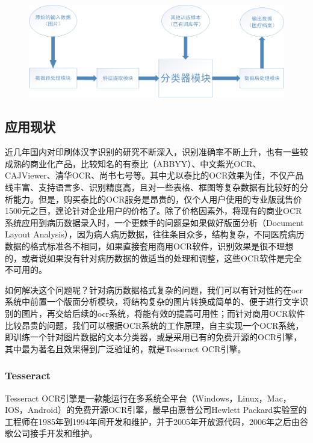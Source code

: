 \begin{figure}
\centering
  \includegraphics[scale=0.3]{figures/ocr-pipeline}
  \label{pic:ocr-pipeline}
\end{figure}

\subsection{应用现状}
近几年国内对印刷体汉字识别的研究不断深入，识别准确率不断上升，也有一些较成熟的商业化产品，比较知名的有泰比（ABBYY）、中文紫光OCR、CAJViewer、清华OCR、尚书七号等。其中尤以泰比的OCR效果为佳，不仅产品线丰富、支持语言多、识别精度高，且对一些表格、框图等复杂数据有比较好的分析能力。但是，购买泰比的OCR服务是昂贵的，仅个人用户使用的专业版就售价1500元之巨，遑论针对企业用户的价格了。除了价格因素外，将现有的商业OCR系统应用到病历数据录入时，一个更棘手的问题是如果做好版面分析（Document Layout Analysis），因为病人病历数据，往往条目众多，结构复杂，不同医院病历数据的格式标准各不相同，如果直接套用商用OCR软件，识别效果是很不理想的，或者说如果没有针对病历数据的做适当的处理和调整，这些OCR软件是完全不可用的。

如何解决这个问题呢？针对病历数据格式复杂的问题，我们可以有针对性的在ocr系统中前置一个版面分析模块，将结构复杂的图片转换成简单的、便于进行文字识别的图片，再交给后续的ocr系统，将能有效的提高可用性；而针对商用OCR软件比较昂贵的问题，我们可以根据OCR系统的工作原理，自主实现一个OCR系统，即训练一个针对图片数据的文本分类器，或是采用已有的免费开源的OCR引擎，其中最为著名且效果得到广泛验证的，就是Tesseract OCR引擎。

\subsubsection{Tesseract}
Tesseract OCR引擎是一款能运行在多系统全平台（Windows，Linux，Mac，IOS，Android）的免费开源OCR引擎，最早由惠普公司Hewlett Packard实验室的工程师在1985年到1994年间开发和维护，并于2005年开放源代码，2006年之后由谷歌公司接手开发和维护\citep{wiki:Tesseract}。


